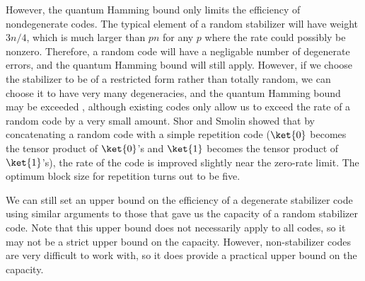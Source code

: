 However, the quantum Hamming bound only limits the efficiency of
nondegenerate codes.  The typical element of a random stabilizer will have
weight $3n/4$, which is much larger than $pn$ for any $p$ where the rate
could possibly be nonzero.  Therefore, a random code will have a
negligable number of degenerate errors, and the quantum Hamming bound
will still apply.  However, if we choose the stabilizer to be of a restricted
form rather than totally random, we can choose it to have very many
degeneracies, and the quantum Hamming bound may be exceeded
\cite{shor-smolin}, although existing codes only allow us to exceed the
rate of a random code by a very small amount.  Shor and Smolin showed that
by concatenating a random code with a simple repetition code ($\ket{0}$
becomes the tensor product of $\ket{0}$'s and $\ket{1}$ becomes the tensor
product of $\ket{1}$'s), the rate of the code is improved slightly near the
zero-rate limit.  The optimum block size for repetition turns out to be five.

We can still set an upper bound on the efficiency of a degenerate stabilizer
code using similar arguments to those that gave us the capacity of a
random stabilizer code.  Note that this upper bound does not necessarily
apply to all codes, so it may not be a strict upper bound on the capacity.
However, non-stabilizer codes are very difficult to work with, so it does
provide a practical upper bound on the capacity.

